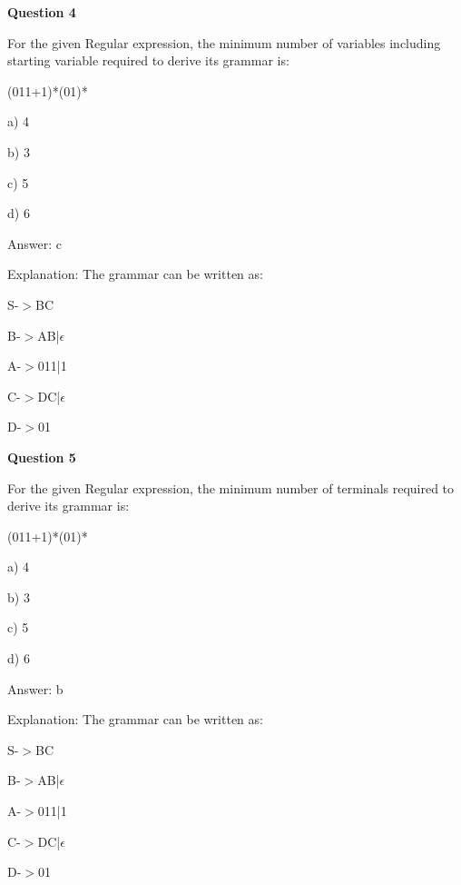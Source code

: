 \documentclass{article}
\begin{document}
\begin{mdframed}[linewidth=1pt, roundcorner=5pt, linecolor=gray!30, backgroundcolor=gray!5]
\textbf{Question 4} 

For the given Regular expression, the minimum number of variables including starting variable required to derive its grammar is:

(011+1)*(01)*

a) 4

b) 3

c) 5

d) 6
\vspace{5pt} \par
\begin{tcolorbox}[colback=green!5, colframe=green!40!black, title=Solution]
Answer: c

Explanation: The grammar can be written as:

S-$>$BC

B-$>$AB|$\epsilon$

A-$>$011|1

C-$>$DC|$\epsilon$

D-$>$01
\end{tcolorbox}
\end{mdframed}

\begin{mdframed}[linewidth=1pt, roundcorner=5pt, linecolor=gray!30, backgroundcolor=gray!5]
\textbf{Question 5} 

For the given Regular expression, the minimum number of terminals required to derive its grammar is:

(011+1)*(01)*

a) 4

b) 3

c) 5

d) 6
\vspace{5pt} \par
\begin{tcolorbox}[colback=green!5, colframe=green!40!black, title=Solution]
Answer: b

Explanation: The grammar can be written as:

S-$>$BC

B-$>$AB|$\epsilon$

A-$>$011|1

C-$>$DC|$\epsilon$

D-$>$01
\end{tcolorbox}
\end{mdframed}
\newpage
\end{document}
